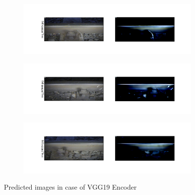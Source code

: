 \begin{figure}[!ht]
    \centering
    \begin{subfigure}{\textwidth}
        \centering
        \includegraphics[width=\textwidth]{./results/vgg19_vgg19/20230510_172958_predict_0.png}
    \end{subfigure}
    \begin{subfigure}{\textwidth}
        \centering
        \includegraphics[width=\textwidth]{./results/vgg19_vgg19/20230510_172958_predict_1.png}
    \end{subfigure}
    \begin{subfigure}{\textwidth}
        \centering
        \includegraphics[width=\textwidth]{./results/vgg19_vgg19/20230510_172958_predict_2.png}
    \end{subfigure}
    \caption{Predicted images in case of VGG19 Encoder}
    \label{fig:vgg19_examples}
\end{figure}


